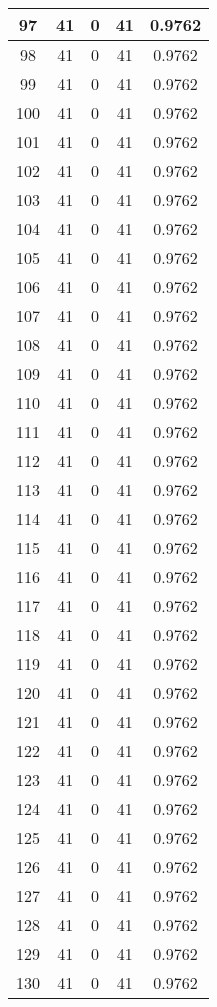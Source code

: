 \documentclass[letterpaper, 12pt]{article}
\begin{document}
\begin{longtable}{|c|c|c|c|c|}
\hline
97 & 41 & 0 & 41 & 0.9762 \\
\hline
98 & 41 & 0 & 41 & 0.9762 \\
\hline
99 & 41 & 0 & 41 & 0.9762 \\
\hline
100 & 41 & 0 & 41 & 0.9762 \\
\hline
101 & 41 & 0 & 41 & 0.9762 \\
\hline
102 & 41 & 0 & 41 & 0.9762 \\
\hline
103 & 41 & 0 & 41 & 0.9762 \\
\hline
104 & 41 & 0 & 41 & 0.9762 \\
\hline
105 & 41 & 0 & 41 & 0.9762 \\
\hline
106 & 41 & 0 & 41 & 0.9762 \\
\hline
107 & 41 & 0 & 41 & 0.9762 \\
\hline
108 & 41 & 0 & 41 & 0.9762 \\
\hline
109 & 41 & 0 & 41 & 0.9762 \\
\hline
110 & 41 & 0 & 41 & 0.9762 \\
\hline
111 & 41 & 0 & 41 & 0.9762 \\
\hline
112 & 41 & 0 & 41 & 0.9762 \\
\hline
113 & 41 & 0 & 41 & 0.9762 \\
\hline
114 & 41 & 0 & 41 & 0.9762 \\
\hline
115 & 41 & 0 & 41 & 0.9762 \\
\hline
116 & 41 & 0 & 41 & 0.9762 \\
\hline
117 & 41 & 0 & 41 & 0.9762 \\
\hline
118 & 41 & 0 & 41 & 0.9762 \\
\hline
119 & 41 & 0 & 41 & 0.9762 \\
\hline
120 & 41 & 0 & 41 & 0.9762 \\
\hline
121 & 41 & 0 & 41 & 0.9762 \\
\hline
122 & 41 & 0 & 41 & 0.9762 \\
\hline
123 & 41 & 0 & 41 & 0.9762 \\
\hline
124 & 41 & 0 & 41 & 0.9762 \\
\hline
125 & 41 & 0 & 41 & 0.9762 \\
\hline
126 & 41 & 0 & 41 & 0.9762 \\
\hline
127 & 41 & 0 & 41 & 0.9762 \\
\hline
128 & 41 & 0 & 41 & 0.9762 \\
\hline
129 & 41 & 0 & 41 & 0.9762 \\
\hline
130 & 41 & 0 & 41 & 0.9762 \\

\end{longtable}
\end{document}

